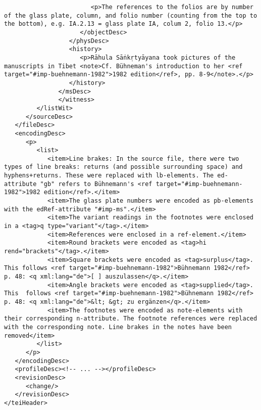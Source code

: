 \documentclass[article,12pt,a4paper]{memoir}%
\begin{document}
\begin{verbatim}
                        <p>The references to the folios are by number of the glass plate, column, and folio number (counting from the top to the bottom), e.g. IA.2.13 = glass plate IA, colum 2, folio 13.</p>
                     </objectDesc>
                  </physDesc>
                  <history>
                     <p>Rāhula Sāṅkṛtyāyana took pictures of the manuscripts in Tibet <note>Cf. Bühneman's introduction to her <ref target="#imp-buehnemann-1982">1982 edition</ref>, pp. 8-9</note>.</p>
                  </history>
               </msDesc>
	           </witness>
         </listWit>
      </sourceDesc>
   </fileDesc>
   <encodingDesc>
      <p>
         <list>
            <item>Line brakes: In the source file, there were two types of line breaks: returns (and possible surrounding space) and hyphens+returns. These were replaced with lb-elements. The ed-attribute "gb" refers to Bühnemann's <ref target="#imp-buehnemann-1982">1982 edition</ref>.</item>
            <item>The glass plate numbers were encoded as pb-elements with the edRef-attribute "#imp-ms".</item>
            <item>The variant readings in the footnotes were enclosed in a <tag>q type="variant"</tag>.</item>
            <item>References were enclosed in a ref-element.</item>
            <item>Round brackets were encoded as <tag>hi rend="brackets"</tag>.</item>
            <item>Square brackets were encoded as <tag>surplus</tag>. This follows <ref target="#imp-buehnemann-1982">Bühnemann 1982</ref> p. 48: <q xml:lang="de">[ ] auszulassen</q>.</item>
            <item>Angle brackets were encoded as <tag>supplied</tag>. This 	follows <ref target="#imp-buehnemann-1982">Bühnemann 1982</ref> p. 48: <q xml:lang="de">&lt; &gt; zu ergänzen</q>.</item>
            <item>The footnotes were encoded as note-elements with their corresponding n-attribute. The footnote references were replaced with the corresponding note. Line brakes in the notes have been removed</item>
         </list>
      </p>
   </encodingDesc>
   <profileDesc><!-- ... --></profileDesc>
   <revisionDesc>
      <change/>
   </revisionDesc>
</teiHeader>
	 \end{verbatim}
       
      \clearpage
      \begin{english}
      \printshorthands
      \printbibliography
      \end{english}
    
\end{document}
